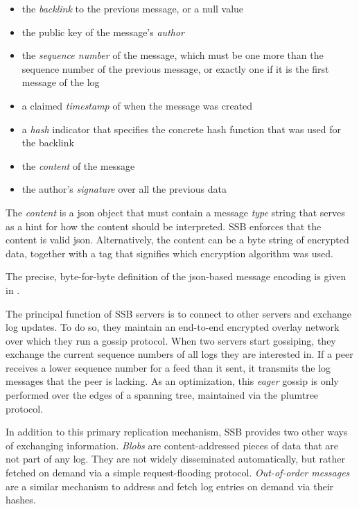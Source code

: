 \documentclass[sigconf]{acmart}
\begin{document}
\begin{itemize}

\item the {\em backlink} to the previous message, or a null value

\item the public key of the message's {\em author}

\item the {\em sequence number} of the message, which must be one more than the sequence number of the previous message, or exactly one if it is the first message of the log

\item a claimed {\em timestamp} of when the message was created

\item a {\em hash} indicator that specifies the concrete hash function that was used for the backlink

\item the {\em content} of the message

\item the author's {\em signature} over all the previous data

\end{itemize}

The {\em content} is a json object that must contain a message {\em type} string that serves as a hint for how the content should be interpreted. SSB enforces that the content is valid json.
Alternatively, the content can be a byte string of encrypted data, together with a tag that signifies which encryption algorithm was used.

The precise, byte-for-byte definition of the json-based message encoding is given in \cite{ssb-spec-messages}.

The principal function of SSB servers is to connect to other servers and exchange log updates. To do so, they maintain an end-to-end encrypted overlay network over which they run a gossip protocol. When two servers start gossiping, they exchange the current sequence numbers of all logs they are interested in. If a peer receives a lower sequence number for a feed than it sent, it transmits the log messages that the peer is lacking. As an optimization, this {\em eager} gossip is only performed over the edges of a spanning tree, maintained via the plumtree~\cite{leitao2007epidemic} protocol.

In addition to this primary replication mechanism, SSB provides two other ways of exchanging information. {\em Blobs} are content-addressed pieces of data that are not part of any log. They are not widely disseminated automatically, but rather fetched on demand via a simple request-flooding protocol. {\em Out-of-order messages} are a similar mechanism to address and fetch log entries on demand via their hashes.
\end{document}
